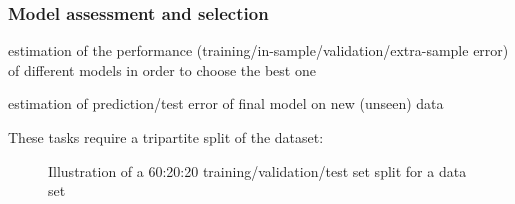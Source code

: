 \documentclass[smaller]{beamer}
\newcommand{\?}{\stackrel{?}{=}}
\begin{document}
\begin{frame}
  \frametitle{Model assessment and selection}\pause
  \begin{description}[widest={withdfds}]
  \item[\bf Selection:] estimation of the performance (training/in-sample/validation/extra-sample error) of different models in
    order to choose the best one\pause
  \item[\bf Assessment:] estimation of prediction/test error of final model on new (unseen) data
  \end{description}\pause
  \bigskip
  
  These tasks require a tripartite split of the dataset:\pause
  \begin{figure}[h!]
    \centering
  \caption{Illustration of a 60:20:20 training/validation/test set split for a data set}
  \label{fig:split}
\end{figure}

\end{frame}
\end{document}
